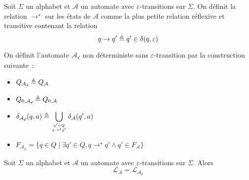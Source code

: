 \begin{definition}
  Soit $\Sigma$ un alphabet et $\mathcal A$ un automate avec
  $\varepsilon$-transitions sur $\Sigma$. On définit la relation $\to^\star$ sur
  les états de $\mathcal A$ comme la plus petite relation  réflexive et
  transitive contenant la relation
  \[q\to q' \triangleq q' \in \delta(q,\varepsilon)\]

  On définit l'automate $\mathcal A_{\not\varepsilon}$ non déterministe sans
  $\varepsilon$-transition par la construction suivante~:
  \begin{itemize}
  \item $Q_{\mathcal A_{\not\varepsilon}} \triangleq Q_\mathcal A$
  \item $Q_{0,\mathcal A_{\not\varepsilon}} \triangleq Q_{0,\mathcal A}$
  \item $\displaystyle\delta_{\mathcal A_{\not\varepsilon}}(q,a) \triangleq
    \bigcup_{{q' \in Q}\atop{q\to^\star q'}} \delta_{\mathcal A}(q',a)$
  \item $F_{\mathcal A_{\not\varepsilon}} =\{q \in Q
    \mid \exists q' \in Q, q \to^\star q' \land q' \in F_\mathcal A\}$
  \end{itemize}
\end{definition}

\begin{proposition}\label{prop.epsi.equiv}
  Soit $\Sigma$ un alphabet et $\mathcal A$ un automate avec
  $\varepsilon$-transitions sur $\Sigma$. Alors
  \[\mathcal L_{\mathcal A} = \mathcal L_{\mathcal A_{\not\varepsilon}}\]
\end{proposition}

